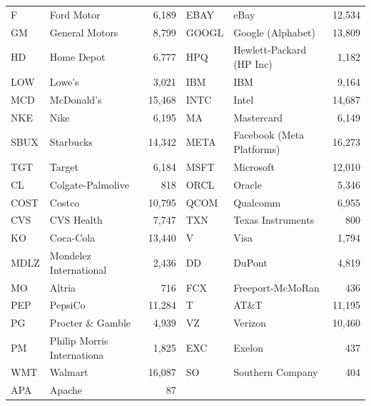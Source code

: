 \begin{tabular}{llrllr}
F & Ford Motor & 6,189 & EBAY & eBay & 12,534 \\
GM & General Motors & 8,799 & GOOGL & Google (Alphabet) & 13,809 \\
HD & Home Depot & 6,777 & HPQ & Hewlett-Packard (HP Inc) & 1,182 \\
LOW & Lowe's & 3,021 & IBM & IBM & 9,164 \\
MCD & McDonald's & 15,468 & INTC & Intel & 14,687 \\
NKE & Nike & 6,195 & MA & Mastercard & 6,149 \\
SBUX & Starbucks & 14,342 & META & Facebook (Meta Platforms) & 16,273 \\
TGT & Target & 6,184 & MSFT & Microsoft & 12,010 \\
CL & Colgate-Palmolive & 818 & ORCL & Oracle & 5,346 \\
COST & Costco & 10,795 & QCOM & Qualcomm & 6,955 \\
CVS & CVS Health & 7,747 & TXN & Texas Instruments & 800 \\
KO & Coca-Cola & 13,440 & V & Visa & 1,794 \\
MDLZ & Mondelez International & 2,436 & DD & DuPont & 4,819 \\
MO & Altria & 716 & FCX & Freeport-McMoRan & 436 \\
PEP & PepsiCo & 11,284 & T & AT\&T & 11,195 \\
PG & Procter \& Gamble & 4,939 & VZ & Verizon & 10,460 \\
PM & Philip Morris Internationa & 1,825 & EXC & Exelon & 437 \\
WMT & Walmart & 16,087 & SO & Southern Company & 404 \\
APA & Apache & 87 &  &  &  \\
\bottomrule
\end{tabular}
